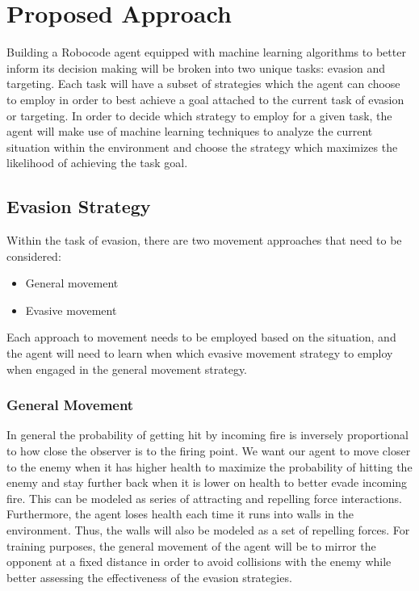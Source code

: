 \documentclass{article}
\theoremstyle{plain}
\theoremstyle{definition}
\theoremstyle{remark}
\begin{document}
\section{Proposed Approach}

Building a Robocode agent equipped with machine learning algorithms to better inform its decision making will be broken into two unique tasks: evasion and targeting. Each task will have a subset of strategies which the agent can choose to employ in order to best achieve a goal attached to the current task of evasion or targeting. In order to decide which strategy to employ for a given task, the agent will make use of machine learning techniques to analyze the current situation within the environment and choose the strategy which maximizes the likelihood of achieving the task goal. 

\subsection*{Evasion Strategy}

Within the task of evasion, there are two movement approaches that need to be considered:
\begin{itemize}

\item General movement 

\item Evasive movement 
\end{itemize}

Each approach to movement needs to be employed based on the situation,  and the agent will need to learn when which evasive movement strategy to employ when engaged in the general movement strategy.

\subsubsection*{General Movement }
In general the probability of getting hit by incoming fire is inversely proportional to how close the observer is to the firing point. We want our agent to move closer to the enemy when it has higher health to maximize the probability of hitting the enemy and stay further back when it is lower on health to better evade incoming fire. This can be modeled as series of attracting and repelling force interactions. Furthermore, the agent loses health each time it runs into walls in the environment. Thus, the walls will also be modeled as a set of repelling forces. For training purposes, the general movement of the agent will be to mirror the opponent at a fixed distance in order to avoid collisions with the enemy while better assessing the effectiveness of the evasion strategies. 
\end{document}
